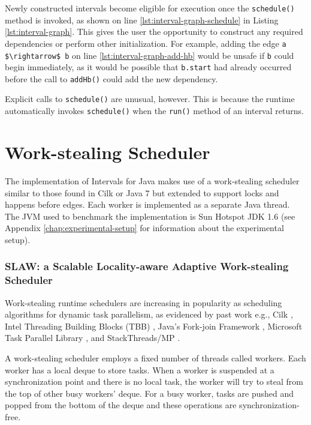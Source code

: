 Newly constructed intervals become eligible for execution once the
\lstinline|schedule()| method is invoked, as shown on line
\ref{lst:interval-graph-schedule} in Listing
\ref{lst:interval-graph}. This gives the user the opportunity to
construct any required dependencies or perform other
initialization. For example, adding the edge
\lstinline|a $\rightarrow$ b| on line \ref{lst:interval-graph-add-hb}
would be unsafe if \lstinline|b| could begin immediately, as it would
be possible that \lstinline|b.start| had already occurred before the
call to \lstinline|addHb()| could add the new dependency.

Explicit calls to \lstinline|schedule()| are unusual, however. This is
because the runtime automatically invokes \lstinline|schedule()| when
the \lstinline|run()| method of an interval returns.


\section{Work-stealing Scheduler}
\label{sec:intro-work-stealing-scheduler}


The implementation of Intervals for Java makes use of a work-stealing
scheduler similar to those found in Cilk \cite{Blumofe1995} or Java 7
\cite{Lea2006} but extended to support locks and happens before
edges. Each worker is implemented as a separate Java thread. The JVM
used to benchmark the implementation is Sun Hotspot JDK 1.6 (see
Appendix \ref{chap:experimental-setup} for information about the
experimental setup).

\subsubsection{SLAW: a Scalable Locality-aware Adaptive Work-stealing
  Scheduler \cite{Guo2010}}

Work-stealing runtime schedulers are increasing in popularity as
scheduling algorithms for dynamic task parallelism, as evidenced by
past work e.g., Cilk \cite{Frigo1998}, Intel Threading Building Blocks
(TBB) \cite{Reinders2007, Contreras2008}, Java's Fork-join Framework
\cite{Lea2000, Lea2000a}, Microsoft Task Parallel Library
\cite{Leijen2009}, and StackThreads/MP \cite{Taura1999}.

A work-stealing scheduler employs a fixed number of threads called
workers. Each worker has a local deque to store tasks. When a worker
is suspended at a synchronization point and there is no local task,
the worker will try to steal from the top of other busy workers'
deque. For a busy worker, tasks are pushed and popped from the bottom
of the deque and these operations are synchronization-free.

